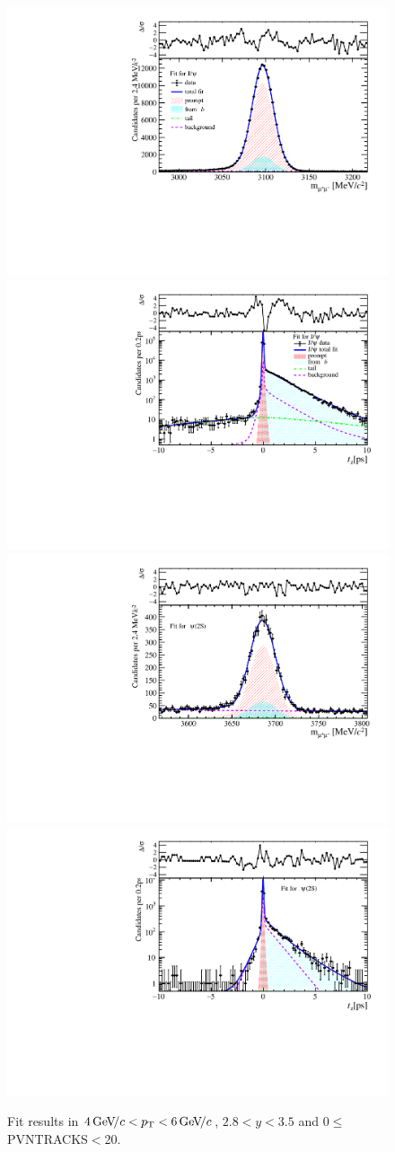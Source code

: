 \begin{figure}[H]
\begin{center}
\includegraphics[width=0.47\linewidth]{pdf/Jpsi/drawmass/n1y2pt3.pdf}
\includegraphics[width=0.47\linewidth]{pdf/Jpsi/2DFit/n1y2pt3.pdf}
\vspace*{-0.5cm}
\includegraphics[width=0.47\linewidth]{pdf/Psi2S/drawmass/n1y2pt3.pdf}
\includegraphics[width=0.47\linewidth]{pdf/Psi2S/2DFit/n1y2pt3.pdf}
\vspace*{-0.5cm}
\end{center}
\caption{Fit results in $4\text{\,Ge\kern -0.1em V\!/}c<p_{\mathrm{T}}<6\text{\,Ge\kern -0.1em V\!/}c$, $2.8<y<3.5$ and 0$\leq$PVNTRACKS$<$20.}
\label{Fitn1y2pt3}
\end{figure}

